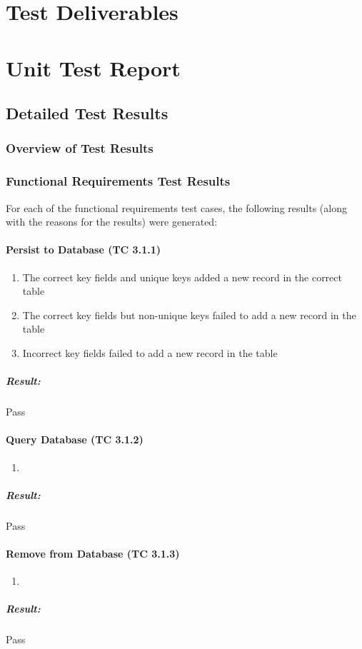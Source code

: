 \documentclass{article}
\begin{document}
\section{Test Deliverables}
	
\section{Unit Test Report}
	\subsection{Detailed Test Results}
		\subsubsection{Overview of Test Results}
		\subsubsection{Functional Requirements Test Results}
			For each of the functional requirements test cases, the following results (along with the reasons for the results) were generated:
			
			\paragraph{Persist to Database (TC 3.1.1)}
				\begin{enumerate}
					\item The correct key fields and unique keys added a new record in the correct table
					\item The correct key fields but non-unique keys failed to add a new record in the table
					\item Incorrect key fields failed to add a new record in the table
				\end{enumerate}
				\subparagraph{Result: } Pass
			
			\paragraph{Query Database (TC 3.1.2)}
				\begin{enumerate}
					\item 
				\end{enumerate}
			
				\subparagraph{Result: } Pass
			
			\paragraph{Remove from Database (TC 3.1.3)}
				\begin{enumerate}
					\item 
				\end{enumerate}
				\subparagraph{Result: } Pass
			
\end{document}
